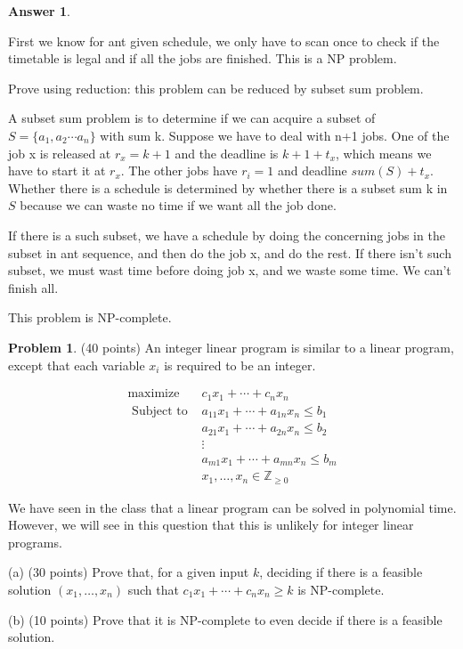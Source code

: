 \documentclass{article}
\theoremstyle{definition}
\newtheorem{prob}{Problem}
\newtheorem{ans}{Answer}
\begin{document}
	\begin{ans}
		~
		
		First we know for ant given schedule, we only have to scan once to check if the timetable is legal and if all the jobs are finished. This is a NP problem.
		
		Prove using reduction: this problem can be reduced by subset sum problem.
		
		A subset sum problem is to determine if we can acquire a subset of $S = \{a_1, a_2\cdots a_n\}$ with sum k. Suppose we have to deal with n+1 jobs. One of the job x is released at $r_x = k+1$ and the deadline is $k+1+t_x$, which means we have to start it at $r_x$. The other jobs have $r_i=1$ and deadline $sum(S)+t_x$. Whether there is a schedule is determined by whether there is a subset sum k in $S$ because we can waste no time if we want all the job done. 
		
		If there is a such subset, we have a schedule by doing the concerning jobs in the subset in ant sequence, and then do the job x, and do the rest. If there isn't such subset, we must wast time before doing job x, and we waste some time. We can't finish all. 
		
		This problem is NP-complete.
	\end{ans}
	
	\begin{prob}
		(40 points) An integer linear program is similar to a linear program, except that each variable $x_{i}$ is required to be an integer.

		$$
		\begin{aligned}
		\operatorname{maximize} & c_{1} x_{1}+\cdots+c_{n} x_{n} \\
		\text { Subject to } & a_{11} x_{1}+\cdots+a_{1 n} x_{n} \leq b_{1} \\
		& a_{21} x_{1}+\cdots+a_{2 n} x_{n} \leq b_{2} \\
		& \vdots \\
		& a_{m 1} x_{1}+\cdots+a_{m n} x_{n} \leq b_{m} \\
		& x_{1}, \ldots, x_{n} \in \mathbb{Z}_{\geq 0}
		\end{aligned}
		$$
		
		We have seen in the class that a linear program can be solved in polynomial time. However, we will see in this question that this is unlikely for integer linear programs.
		
		(a) (30 points) Prove that, for a given input $k$, deciding if there is a feasible solution $\left(x_{1}, \ldots, x_{n}\right)$ such that $c_{1} x_{1}+\cdots+c_{n} x_{n} \geq k$ is NP-complete.
		
		(b) (10 points) Prove that it is NP-complete to even decide if there is a feasible solution. 
	\end{prob}	
	
\end{document}
